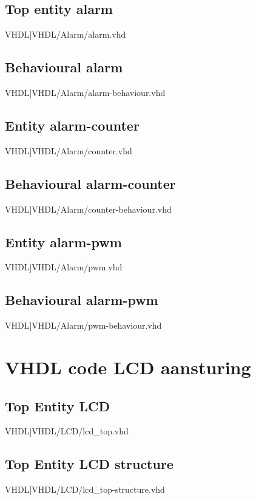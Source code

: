 \subsection{Top entity alarm}
\scriptsize 
 VHDL]{VHDL/Alarm/alarm.vhd}
\normalsize
\label{code:ent_alarm}
\subsection{Behavioural alarm}
\scriptsize 
 VHDL]{VHDL/Alarm/alarm-behaviour.vhd}
\normalsize
\label{code:beh_alarm}
\subsection{Entity alarm-counter}
\scriptsize 
 VHDL]{VHDL/Alarm/counter.vhd}
\normalsize
\label{code:ent_alarm_counter}
\subsection{Behavioural alarm-counter}
\scriptsize 
 VHDL]{VHDL/Alarm/counter-behaviour.vhd}
\normalsize
\label{code:beh_alarm_counter}
\subsection{Entity alarm-pwm}
\scriptsize 
 VHDL]{VHDL/Alarm/pwm.vhd}
\normalsize
\label{code:ent_alarm_pwm}
\subsection{Behavioural alarm-pwm}
\scriptsize 
 VHDL]{VHDL/Alarm/pwm-behaviour.vhd}
\normalsize
\label{code:beh_alarm_pwm}

\section{VHDL code LCD aansturing}

\label{code:ent_lcd_top}
\subsection{Top Entity LCD}
\scriptsize 
 VHDL]{VHDL/LCD/lcd_top.vhd}
\normalsize
\subsection{Top Entity LCD structure}
\label{code:ent_lcd_top_structure}
\scriptsize 
 VHDL]{VHDL/LCD/lcd_top-structure.vhd}
\normalsize

